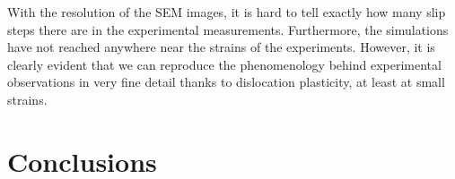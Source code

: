 With the resolution of the SEM images, it is hard to tell exactly how many slip steps there are in the experimental measurements. Furthermore, the simulations have not reached anywhere near the strains of the experiments. However, it is clearly evident that we can reproduce the phenomenology behind experimental observations in very fine detail thanks to dislocation plasticity, at least at small strains.

\section{Conclusions}

